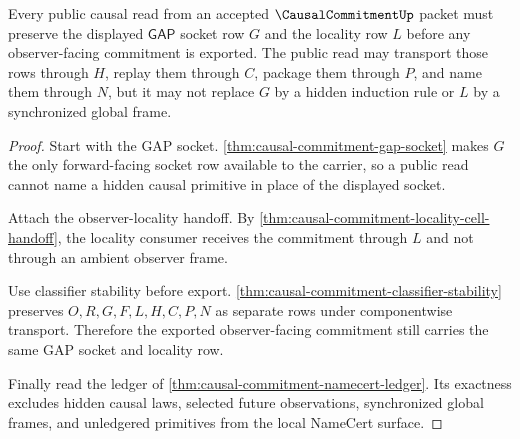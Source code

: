 \begin{theorem}
\label{thm:causal-commitment-gap-locality-exactness}
Every public causal read from an accepted $\CausalCommitmentUp$ packet must preserve the displayed $\mathsf{GAP}$ socket row $G$ and the locality row $L$ before any observer-facing commitment is exported. The public read may transport those rows through $H$, replay them through $C$, package them through $P$, and name them through $N$, but it may not replace $G$ by a hidden induction rule or $L$ by a synchronized global frame.
\end{theorem}
\begin{proof}
Start with the GAP socket. \autoref{thm:causal-commitment-gap-socket} makes $G$ the only forward-facing socket row available to the carrier, so a public read cannot name a hidden causal primitive in place of the displayed socket.

Attach the observer-locality handoff. By \autoref{thm:causal-commitment-locality-cell-handoff}, the locality consumer receives the commitment through $L$ and not through an ambient observer frame.

Use classifier stability before export. \autoref{thm:causal-commitment-classifier-stability} preserves $O,R,G,F,L,H,C,P,N$ as separate rows under componentwise transport. Therefore the exported observer-facing commitment still carries the same GAP socket and locality row.

Finally read the ledger of \autoref{thm:causal-commitment-namecert-ledger}. Its exactness excludes hidden causal laws, selected future observations, synchronized global frames, and unledgered primitives from the local NameCert surface.
\end{proof}

